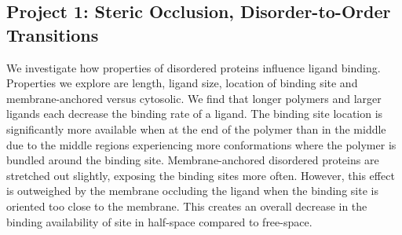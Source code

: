 \documentclass[onecolumn]{article}
\begin{document}



%
%

\subsection*{Project 1: Steric Occlusion, Disorder-to-Order Transitions}

We investigate how properties of disordered proteins influence ligand binding. Properties we explore are length, ligand size, location of binding site and membrane-anchored versus cytosolic. We find that longer polymers and larger ligands each decrease the binding rate of a ligand. The binding site location is significantly more available when at the end of the polymer than in the middle due to the middle regions experiencing more conformations where the polymer is bundled around the binding site. Membrane-anchored disordered proteins are stretched out slightly, exposing the binding sites more often. However, this effect is outweighed by the membrane occluding the ligand when the binding site is oriented too close to the membrane. This creates an overall decrease in the binding availability of site in half-space compared to free-space.
\end{document}
